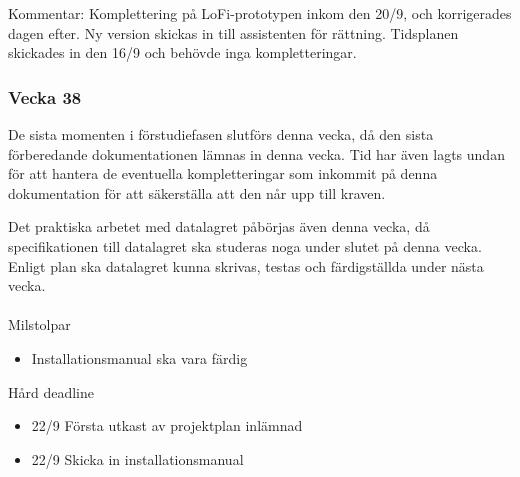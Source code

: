 \documentclass{TDP003mall}
\begin{document}
Kommentar: Komplettering på LoFi-prototypen inkom den 20/9, och korrigerades dagen efter. Ny version skickas in till assistenten för rättning.
Tidsplanen skickades in den 16/9 och behövde inga kompletteringar.
\\

\pagebreak

\subsubsection*{Vecka 38}

De sista momenten i förstudiefasen slutförs denna vecka, då den sista förberedande dokumentationen lämnas in denna vecka. Tid har även lagts undan för att hantera de eventuella kompletteringar som inkommit på denna dokumentation för att säkerställa att den når upp till kraven.

Det praktiska arbetet med datalagret påbörjas även denna vecka, då specifikationen till datalagret ska studeras noga under slutet på denna vecka. Enligt plan ska datalagret kunna skrivas, testas och färdigställda under nästa vecka.\\
\\
Milstolpar
\begin{itemize}
\color{blue}
    \item Installationsmanual ska vara färdig
\end{itemize}

Hård deadline

\begin{itemize}
\color{red}
    \item 22/9 Första utkast av projektplan inlämnad

    \item 22/9 Skicka in
installationsmanual
\end{itemize}
\end{document}
